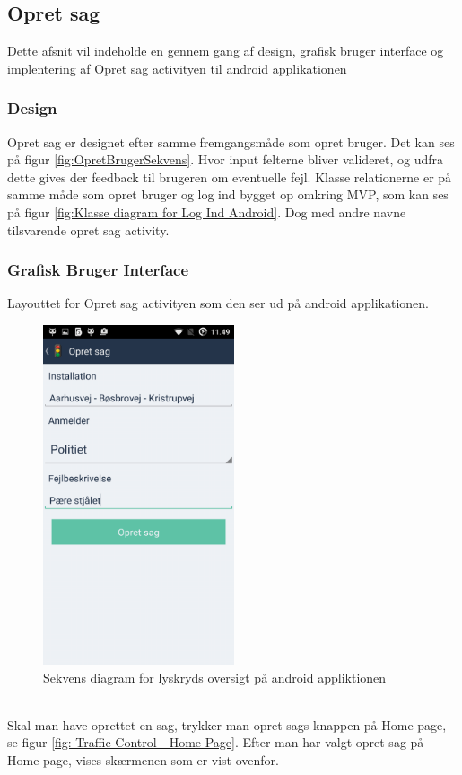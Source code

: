 \subsection{Opret sag}
	Dette afsnit vil indeholde en gennem gang af design, grafisk bruger interface og implentering af Opret sag activityen til android applikationen
	
	\subsubsection{Design}
	Opret sag er designet efter samme fremgangsmåde som opret bruger. Det kan ses på figur \vref{fig:OpretBrugerSekvens}. Hvor input felterne bliver valideret, og udfra dette gives der feedback til brugeren om eventuelle fejl. 
	Klasse relationerne er på samme måde som opret bruger og log ind bygget op omkring MVP, som kan ses på figur \vref{fig:Klasse diagram for Log Ind Android}.
	Dog med andre navne tilsvarende opret sag activity.
	
	\subsubsection{Grafisk Bruger Interface}
	Layouttet for Opret sag activityen som den ser ud på android applikationen.
	\begin{figure} [!ht]
		\begin{center}
			\includegraphics[height=10cm]{Android/Billeder/AndroidOpretSag}
		\end{center}
		\caption{Sekvens diagram for lyskryds oversigt på android appliktionen}
		\label{fig:Opret sag på android applikationen }
	\end{figure} \\
	Skal man have oprettet en sag, trykker man opret sags knappen på Home page, se figur \vref{fig: Traffic Control - Home Page}. Efter man har valgt opret sag på Home page, vises skærmenen som er vist ovenfor. \\
	
